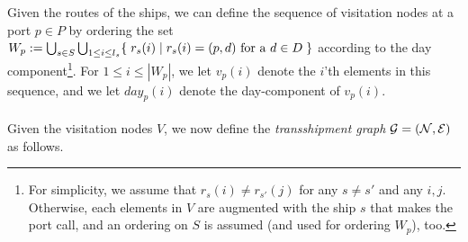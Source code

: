 Given the routes of the ships, we can define the sequence of visitation nodes at a port $p\in P$ by ordering the set 
$W_p:= \bigcup_{s\in S}\bigcup_{1\leq i \leq l_s}\{\;{r_s(i)}\;|\;{r_s(i)=(p,d)\text{ for a }d\in D}\;\}$ according to the day component\footnote{For simplicity, we assume that  $r_s(i) \neq r_{s'}(j)$ for any $s \neq s'$ and any $i,j$. Otherwise, each elements in $V$ are augmented with the ship $s$ that makes the port call, and an ordering on $S$ is assumed (and used for ordering $W_p$), too.}.
For $1\leq i\leq |W_p|$, we let $v_p(i)$ denote the $i$'th elements in this sequence, and we let $\textit{day}_p(i)$ denote the day-component of $v_p(i)$.  
\\
\\
Given the visitation nodes $V$, we now define the \emph{transshipment graph} $\mathcal{G}=(\mathcal{N},\mathcal{E})$ as follows.

